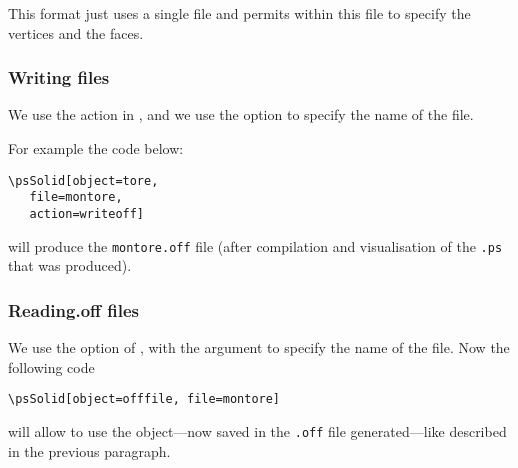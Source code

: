 This format just uses a single file and permits within this file to specify the
vertices and the faces.

\subsubsection{Writing \texttt{} files}

We use the action  in , and we use the option
  to specify the name of the file.

For example the code below:
\begin{verbatim}
\psSolid[object=tore,
   file=montore,
   action=writeoff]
\end{verbatim}
will produce the \texttt{montore.off} file (after compilation and
visualisation of the \texttt{.ps} that was produced).

\subsubsection{Reading.off files}

We use the option  of , with the argument
 to specify the name of the file.
Now the following code
\begin{verbatim}
\psSolid[object=offfile, file=montore]
\end{verbatim}
will allow to use the object---now saved in the \texttt{.off} file
generated---like described in the previous paragraph.

\endinput
